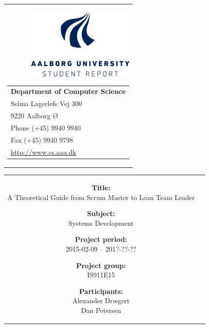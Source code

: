 \begin{nopagebreak}
	{\samepage 
		\begin{tabular}{r}
			\parbox{16cm}
			{\raisebox{11mm}
				{\includegraphics[height=3.5cm]{Addendum/TitlePage/aauIcon.png}}
				\hfill \parbox{8.5cm}{\vspace{-5cm}
				\begin{tabular}{l}
					{\small \textbf{Department of Computer Science}}\\
					{\small Selma Lagerløfs Vej 300} \\
					{\small 9220 Aalborg Ø} \\
					{\small Phone (+45) 9940 9940} \\
					{\small Fax (+45) 9940 9798} \\
					{\small \url{http://www.cs.aau.dk}}
				\end{tabular}}
			}
		\end{tabular}
		
		\begin{tabular}{cc}
			\parbox{7cm}{
				\begin{description}
					\item {\textbf{Title:}} \\
						A Theoretical Guide from Scrum Master to Lean Team Leader\\
					
					\item {\textbf{Subject:}} \\
						Systems Development\\	
						
					\item {\textbf{Project period:}}\\
						  2015-02-09 -- 201?-??-??\\

					\item {\textbf{Project group:}}\\
						  IS911E15\\
			
					\item {\textbf{Participants:}}\\
						Alexander Drægert\\
						Dan Petersen\\
						  

\end{description}}
\end{tabular}}
\end{nopagebreak}
